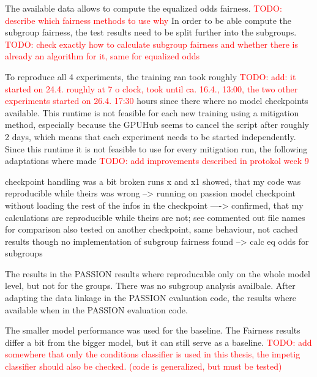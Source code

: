 \documentclass[12pt, a4paper, oneside]{book}   	%
\renewcommand{\todo}[1]{\textcolor{red}{TODO: #1}}
\begin{document}
			The available data allows to compute the equalized odds fairness. \todo{describe which fairness methods to use why}
			In order to be able compute the subgroup fairness, the test results need to be split further into the subgroups. \todo{check exactly how to calculate subgroup fairness and whether there is already an algorithm for it, same for equalized odds}
			
			To reproduce all 4 experiments, the training ran took roughly \todo{add: it started on 24.4. roughly at 7 o clock, took until ca. 16.4., 13:00, the two other experiments started on 26.4. 17:30} hours since there where no model checkpoints available. This runtime is not feasible for each new training using a mitigation method, especially because the GPUHub seems to cancel the script after roughly 2 days, which means that each experiment needs to be started independently.
			Since this runtime it is not feasible to use for every mitigation run, the following adaptations where made \todo{add improvements described in protokol week 9}
			
			
			checkpoint handling was a bit broken
			runs x and x1 showed, that my code was reproducible while theirs was wrong
			--> running on passion model checkpoint without loading the rest of the infos in the checkpoint
			----> confirmed, that my calculations are reproducible while theirs are not; see commented out file names for comparison
			also tested on another checkpoint, same behaviour, not cached results though
			no implementation of subgroup fairness found --> calc eq odds for subgroups
			
			The results in the PASSION results where reproducable only on the whole model level, but not for the groups. There was no subgroup analysis availbale.
			After adapting the data linkage in the PASSION evaluation code, the results where available when in the PASSION evaluation code. 
			
			
			The smaller model performance was used for the baseline. The Fairness results differ a bit from the bigger model, but it can still serve as a baseline.
			\todo{add somewhere that only the conditions classifier is used in this thesis, the impetig classifier should also be checked. (code is generalized, but must be tested)}
			
\end{document}
